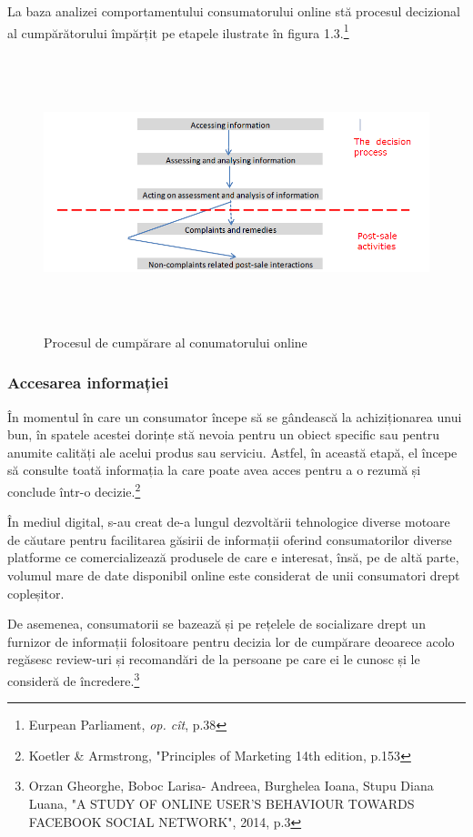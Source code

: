 \documentclass[a4paper, 12pt]{article}
\begin{document}
		\quad La baza analizei comportamentului consumatorului online stă procesul decizional al cumpărătorului împărțit pe etapele ilustrate în figura 1.3.\footnote{Eurpean Parliament, \textit{op. cît}, p.38}
		\begin{figure}[!htb]
			\centering
			\includegraphics[width=12cm, height=8cm]{"figures/third.png"}
			\caption{Procesul de cumpărare al conumatorului online}\label{fig:third}
		\end{figure}
	
		\subsubsection{Accesarea informației}
		\quad\quad
		 În momentul în care un consumator începe să se gândească la  achiziționarea unui bun, în spatele acestei dorințe stă nevoia pentru un obiect specific sau pentru anumite calități ale acelui produs sau serviciu. Astfel, în această etapă, el începe să consulte toată informația la care poate avea acces pentru a o rezumă și conclude într-o decizie.\footnote{Koetler \& Armstrong, "Principles of Marketing 14th edition, p.153}
		
 		\quad În mediul digital, s-au creat de-a lungul dezvoltării tehnologice diverse motoare de căutare pentru facilitarea găsirii de informații oferind consumatorilor diverse platforme ce comercializează produsele de care e interesat, însă, pe de altă parte, volumul mare de date disponibil online este considerat de unii consumatori drept copleșitor.
		 
	 	\quad De asemenea, consumatorii se bazează  și pe  rețelele de socializare drept un furnizor de informații folositoare pentru decizia lor de cumpărare deoarece acolo regăsesc review-uri și recomandări de la persoane pe care ei le cunosc și le consideră de încredere.\footnote{Orzan Gheorghe, Boboc Larisa- Andreea, Burghelea Ioana, Stupu Diana Luana, "A STUDY OF ONLINE USER’S BEHAVIOUR TOWARDS FACEBOOK SOCIAL NETWORK", 2014, p.3}
		
\end{document}
